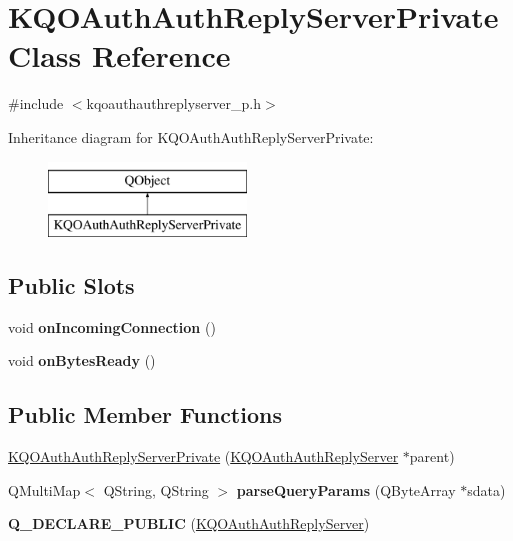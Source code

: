 \hypertarget{class_k_q_o_auth_auth_reply_server_private}{}\section{K\+Q\+O\+Auth\+Auth\+Reply\+Server\+Private Class Reference}
\label{class_k_q_o_auth_auth_reply_server_private}


{\ttfamily \#include $<$kqoauthauthreplyserver\+\_\+p.\+h$>$}

Inheritance diagram for K\+Q\+O\+Auth\+Auth\+Reply\+Server\+Private\+:\begin{figure}[H]
\begin{center}
\leavevmode
\includegraphics[height=2.000000cm]{class_k_q_o_auth_auth_reply_server_private}
\end{center}
\end{figure}
\subsection*{Public Slots}
\begin{DoxyCompactItemize}
\item 
\mbox{\label{class_k_q_o_auth_auth_reply_server_private_a8e0097c22308b9a3d24c0095f990fc89}} 
void {\bfseries on\+Incoming\+Connection} ()
\item 
\mbox{\label{class_k_q_o_auth_auth_reply_server_private_a8ad7071e015e6ebc1939173e1b1884b9}} 
void {\bfseries on\+Bytes\+Ready} ()
\end{DoxyCompactItemize}
\subsection*{Public Member Functions}
\begin{DoxyCompactItemize}
\item 
\hyperlink{class_k_q_o_auth_auth_reply_server_private_a638a7c5556c25e16955294f8aaa77c1b}{K\+Q\+O\+Auth\+Auth\+Reply\+Server\+Private} (\hyperlink{class_k_q_o_auth_auth_reply_server}{K\+Q\+O\+Auth\+Auth\+Reply\+Server} $\ast$parent)
\item 
\mbox{\label{class_k_q_o_auth_auth_reply_server_private_a7507ae6f36c62a1287aa65d021ac07a3}} 
Q\+Multi\+Map$<$ Q\+String, Q\+String $>$ {\bfseries parse\+Query\+Params} (Q\+Byte\+Array $\ast$sdata)
\item 
\mbox{\label{class_k_q_o_auth_auth_reply_server_private_a6a29deb97bcba8731d819afefb85a818}} 
{\bfseries Q\+\_\+\+D\+E\+C\+L\+A\+R\+E\+\_\+\+P\+U\+B\+L\+IC} (\hyperlink{class_k_q_o_auth_auth_reply_server}{K\+Q\+O\+Auth\+Auth\+Reply\+Server})
\end{DoxyCompactItemize}
